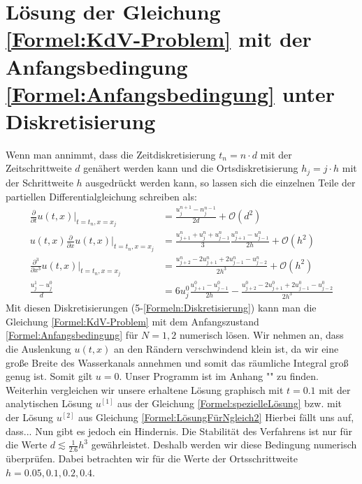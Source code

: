 \documentclass[ngerman]{scrartcl}
\begin{document}

\section{Lösung der Gleichung \ref{Formel:KdV-Problem} mit der Anfangsbedingung \ref{Formel:Anfangsbedingung} unter Diskretisierung}
Wenn man annimmt, dass die Zeitdiskretisierung $t_n = n \cdot d$ mit der Zeitschrittweite $d$ genähert werden kann und die Ortsdiskretisierung $h_j = j \cdot h$ mit der Schrittweite $h$ ausgedrückt werden kann, so lassen sich die einzelnen Teile der partiellen Differentialgleichung schreiben als:
\begin{align}
\frac{\partial}{\partial t}u(t,x) \bigg|_{t=t_n, x=x_j} &=\frac{u_j^{n+1}-n_j^{n-1}}{2d} + \mathcal O(d^2) \\
u(t,x) \frac{\partial}{\partial x}u(t,x) \bigg|_{t=t_n, x=x_j} &=\frac{u_{j+1}^n + u_j^n + u_{j-1}^n}{3} \frac{u_{j+1}^n - u_{j-1}^n}{2h} + \mathcal O(h^2) \\
\frac{\partial^3}{\partial x^3}u(t,x) \bigg|_{t=t_n, x=x_j} &=\frac{u_{j+2}^n - 2 u_{j+1}^n + 2 u_{j-1}^n - u_{j-2}^n}{2h^3} + \mathcal O(h^2) \\
\frac{u_j^1 - u_j^0}{d} &= 6u_j^0 \frac{u_{j+1}^0 - u_{j-1}^0}{2h} - \frac{u_{j+2}^0 - 2u_{j+1}^0 + 2u_{j-1}^0 - u_{j-2}^0}{2h^3}
\label{Formeln:Diskretisierung}
\end{align}
Mit diesen Diskretisierungen (5-\ref{Formeln:Diskretisierung}) kann man die Gleichung \ref{Formel:KdV-Problem} mit dem Anfangszustand \ref{Formel:Anfangsbedingung} für $N=1,2$ numerisch lösen. Wir nehmen an, dass die Auslenkung $u(t,x)$ an den Rändern verschwindend klein ist, da wir eine große Breite des Wasserkanals annehmen und somit das räumliche Integral groß genug ist. Somit gilt $u=0$. Unser Programm ist im Anhang "" zu finden. \\
Weiterhin vergleichen wir unsere erhaltene Lösung graphisch mit $t=0.1$ mit der analytischen Lösung $u^{[1]}$ aus der Gleichung \ref{Formel:spezielleLösung} bzw. mit der Lösung $u^{[2]}$ aus Gleichung \ref{Formel:LösungFürNgleich2}  
Hierbei fällt uns auf, dass...
Nun gibt es jedoch ein Hindernis. Die Stabilität des Verfahrens ist nur für die Werte $d \lesssim \frac{1}{2.6}h^3$ gewährleistet. Deshalb werden wir diese Bedingung numerisch überprüfen. Dabei betrachten wir für die Werte der Ortsschrittweite $h=0.05, 0.1, 0.2, 0.4$. 
\end{document}
